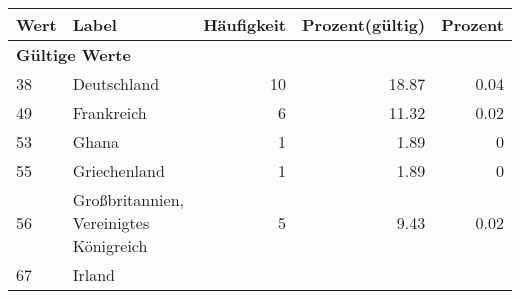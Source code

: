      \begin{longtable}{lXrrr}
     \toprule
     \textbf{Wert} & \textbf{Label} & \textbf{Häufigkeit} & \textbf{Prozent(gültig)} & \textbf{Prozent} \\
     \endhead
     \midrule
     \multicolumn{5}{l}{\textbf{Gültige Werte}}\\

     38 &
     \multicolumn{1}{X}{ Deutschland   } &


       \num{10} &
       \num[round-mode=places,round-precision=2]{18,87} &
         \num[round-mode=places,round-precision=2]{0,04} \\

     49 &
     \multicolumn{1}{X}{ Frankreich   } &


       \num{6} &
       \num[round-mode=places,round-precision=2]{11,32} &
         \num[round-mode=places,round-precision=2]{0,02} \\

     53 &
     \multicolumn{1}{X}{ Ghana   } &


       \num{1} &
       \num[round-mode=places,round-precision=2]{1,89} &
         \num[round-mode=places,round-precision=2]{0} \\

     55 &
     \multicolumn{1}{X}{ Griechenland   } &


       \num{1} &
       \num[round-mode=places,round-precision=2]{1,89} &
         \num[round-mode=places,round-precision=2]{0} \\

     56 &
     \multicolumn{1}{X}{ Großbritannien, Vereinigtes Königreich   } &


       \num{5} &
       \num[round-mode=places,round-precision=2]{9,43} &
         \num[round-mode=places,round-precision=2]{0,02} \\

     67 &
     \multicolumn{1}{X}{ Irland   } &



\end{longtable}
